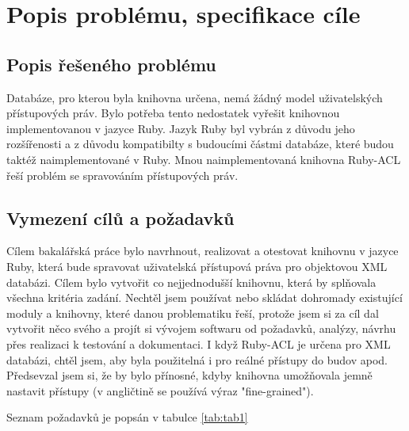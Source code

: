 \chapter{Popis problému, specifikace cíle}

\section{Popis řešeného problému}

Databáze, pro kterou byla knihovna určena, nemá žádný model uživatelských přístupových práv. Bylo potřeba tento nedostatek vyřešit knihovnou implementovanou v jazyce Ruby. Jazyk Ruby byl vybrán z důvodu jeho rozšířenosti a z důvodu kompatibilty s budoucími částmi databáze, které budou taktéž naimplementované v Ruby. Mnou naimplementovaná knihovna Ruby-ACL řeší problém se spravováním přístupových práv.

\section{Vymezení cílů a požadavků}
Cílem bakalářská práce bylo navrhnout, realizovat a otestovat knihovnu v jazyce Ruby, která bude spravovat uživatelská přístupová práva pro objektovou XML databázi.
Cílem bylo vytvořit co nejjednodušší knihovnu, která by splňovala všechna kritéria zadání. Nechtěl jsem používat nebo skládat dohromady existující moduly a knihovny, které danou problematiku řeší, protože jsem si za cíl dal vytvořit něco svého a projít si vývojem softwaru od požadavků, analýzy, návrhu přes realizaci k testování a dokumentaci. 
I když Ruby-ACL je určena pro XML databázi, chtěl jsem, aby byla použitelná i pro reálné přístupy do budov apod.
Předsevzal jsem si, že by bylo přínosné, kdyby knihovna umožňovala jemně nastavit přístupy (v angličtině se používá výraz "fine-grained").

\noindent
Seznam požadavků je popsán v tabulce  \ref{tab:tab1}

